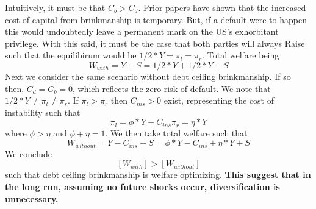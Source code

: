 \documentclass[12pt]{article}
\begin{document}
\setlength{\extrarowheight}{2pt}
\begin{table}[htbp]
    \caption{Game Theory Table}
    \label{tab:game_theory}
\end{table} \noindent Intuitively, it must be that $C_b>C_d$. Prior papers have shown that the increased cost of capital from brinkmanship is temporary. But, if a default were to happen this would undoubtedly leave a permanent mark on the US's exhorbitant privilege. With this said, it must be the case that both parties will always Raise such that the equilibirum would be $1/2*Y=\pi_l=\pi_r$. Total welfare being $$W_{with}=Y+S=1/2*Y+1/2*Y+S$$
Next we consider the same scenario without debt ceiling brinkmanship. If so then, $C_d=C_b=0$, which reflects the zero risk of default. We note that $1/2*Y\neq\pi_l\neq\pi_r$. If $\pi_l>\pi_r$ then $C_{ins}>0$ exist, representing the cost of instability such that $$\pi_l=\phi*Y-C_{ins} \pi_r=\eta*Y$$ where $\phi > \eta$ and $\phi+\eta=1$. We then take total welfare such that $$W_{without}=Y-C_{ins}+S=\phi*Y-C_{ins} + \eta*Y+S$$
We conclude $$[W_{with}]>[W_{without}]$$ such that debt ceiling brinkmanship is welfare optimizing. \textbf{This suggest that in the long run, assuming no future shocks occur, diversification is unnecessary.} \\
\end{document}
